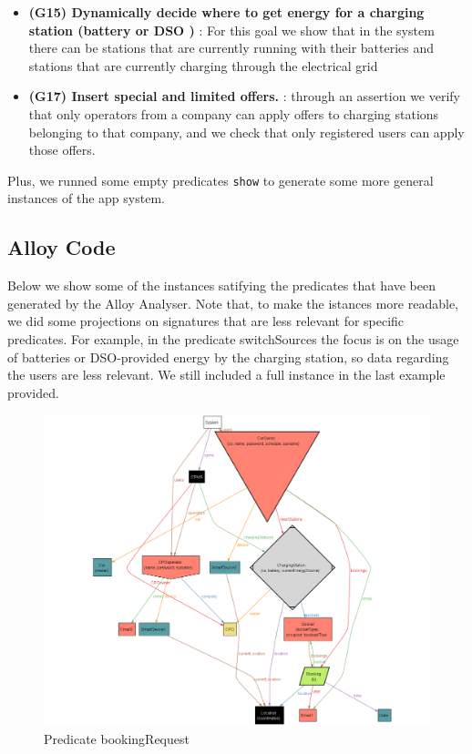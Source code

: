\documentclass[table, 12pt]{article} %
\begin{document}
\begin{itemize}
        \item \textbf{(G15) Dynamically decide where to get energy for a charging station (battery or DSO ) }: For this goal we show that in the system there can be stations that are currently running with their batteries and stations that are currently charging through the electrical grid 
        \item \textbf{(G17) Insert special and limited offers. }: through an assertion we verify that only operators from a company can apply offers to charging stations belonging to that company, and we check that only registered users can apply those offers.
 
        
    \end{itemize}

    Plus, we runned some empty predicates \texttt{show} to generate some more general instances of the app system.

    \subsection{Alloy Code}
    

    Below we show some of the instances satifying the predicates that have been generated by the Alloy Analyser.
    Note that, to make the istances more readable, we did some projections on signatures that are less relevant for specific predicates. 
    For example, in the predicate switchSources the focus is on the usage of batteries or DSO-provided energy by the charging station, so data regarding the users are less relevant.
    We still included a full instance in the last example provided.

    \begin{center}
        \begin{figure}[H]
            \includegraphics[scale=0.38, center]{assets/alloy/pred_bookingRequest.png}
            \caption{Predicate bookingRequest}
            \label{fig: bookingRequest_alloy}
        \end{figure}
    \end{center}
\end{document}

